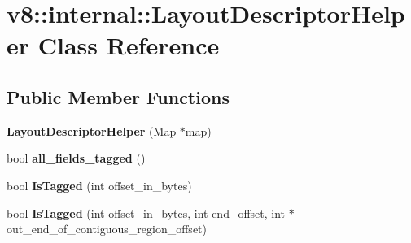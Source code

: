 \hypertarget{classv8_1_1internal_1_1_layout_descriptor_helper}{}\section{v8\+:\+:internal\+:\+:Layout\+Descriptor\+Helper Class Reference}
\label{classv8_1_1internal_1_1_layout_descriptor_helper}
\subsection*{Public Member Functions}
\begin{DoxyCompactItemize}
\item 
{\bfseries Layout\+Descriptor\+Helper} (\hyperlink{classv8_1_1internal_1_1_map}{Map} $\ast$map)\hypertarget{classv8_1_1internal_1_1_layout_descriptor_helper_af363cc03b77cc79f76c445cdee614ef7}{}\label{classv8_1_1internal_1_1_layout_descriptor_helper_af363cc03b77cc79f76c445cdee614ef7}

\item 
bool {\bfseries all\+\_\+fields\+\_\+tagged} ()\hypertarget{classv8_1_1internal_1_1_layout_descriptor_helper_a1f485eb7b0e61877d618bfd0b8258736}{}\label{classv8_1_1internal_1_1_layout_descriptor_helper_a1f485eb7b0e61877d618bfd0b8258736}

\item 
bool {\bfseries Is\+Tagged} (int offset\+\_\+in\+\_\+bytes)\hypertarget{classv8_1_1internal_1_1_layout_descriptor_helper_a3832b13cf57c4c18316b8d9272fa3d19}{}\label{classv8_1_1internal_1_1_layout_descriptor_helper_a3832b13cf57c4c18316b8d9272fa3d19}

\item 
bool {\bfseries Is\+Tagged} (int offset\+\_\+in\+\_\+bytes, int end\+\_\+offset, int $\ast$out\+\_\+end\+\_\+of\+\_\+contiguous\+\_\+region\+\_\+offset)\hypertarget{classv8_1_1internal_1_1_layout_descriptor_helper_a5db3e8c7f81db699556171ea1965b8b2}{}\label{classv8_1_1internal_1_1_layout_descriptor_helper_a5db3e8c7f81db699556171ea1965b8b2}

\end{DoxyCompactItemize}
